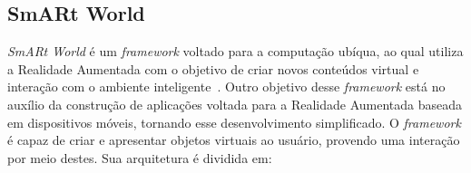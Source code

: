 \subsection{SmARt World}
\label{sec:smart}

	\textit{SmARt World} é um \textit{framework} voltado para a computação ubíqua, ao qual utiliza a 
	Realidade Aumentada com o objetivo de criar novos conteúdos virtual e interação com o ambiente
	inteligente~\cite{yew}. Outro objetivo desse \textit{framework} está no auxílio da construção de
	aplicações voltada para a Realidade Aumentada baseada em dispositivos móveis, tornando esse
	desenvolvimento simplificado. O \textit{framework} é capaz de criar e apresentar objetos virtuais
	ao usuário, provendo uma interação por meio destes. Sua arquitetura é dividida em: 
	
	
	
